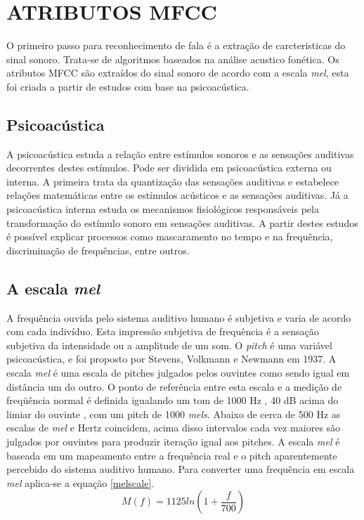 \chapter{ATRIBUTOS MFCC}
 \thispagestyle{plain}
O primeiro passo para reconhecimento de fala é a extração de carcteristicas  do sinal sonoro. Trata-se de algoritmos baseados na análise acustico fonética. Os atributos MFCC são extraídos do sinal sonoro de acordo com a escala \textit{mel}, esta foi criada a partir de estudos com base na psicoacústica.

\section{Psicoacústica} 
\quad A psicoacústica estuda a relação entre estímulos sonoros e as sensações auditivas decorrentes destes estímulos. Pode ser dividida em psicoacústica externa ou interna. A primeira trata da quantização das sensações auditivas e estabelece relações matemáticas entre os estímulos acústicos e as sensações auditivas. Já a psicoacústica interna estuda os mecanismos fisiológicos responsáveis pela transformação do estímulo sonoro em sensações auditivas. A partir destes estudos é possível explicar processos como mascaramento no tempo e na frequência, discriminação de frequências, entre outros.

\section{A escala \textit{mel}}
A frequência ouvida pelo sistema auditivo humano é subjetiva e varia de acordo com cada indivíduo. Esta impressão subjetiva de frequência é a sensação subjetiva da intensidade ou a amplitude de um som. O \textit{pitch} é uma variável psicoacústica, e foi  proposto por Stevens, Volkmann e Newmann em 1937. A escala \textit{mel} é uma escala de pitches julgados pelos ouvintes como sendo igual em distância um do outro. O ponto de referência entre esta escala e a medição de freqüência normal é definida  igualando um tom de 1000 Hz , 40 dB acima do limiar do ouvinte , com um pitch de 1000 \textit{mels}. Abaixo de cerca de 500 Hz as escalas de \textit{mel} e Hertz coincidem, acima disso intervalos cada vez maiores são julgados por ouvintes para produzir iteração igual aos pitches. A escala \textit{mel} é baseada em um mapeamento entre a frequência real e o pitch aparentemente percebido do sistema auditivo humano. Para converter uma frequência em escala \textit{mel} aplica-se a equação \ref{melscale}.
\begin{equation}
\label{melscale}
M(f) = 1125 ln(1 + \frac{f}{700})
\end{equation}



